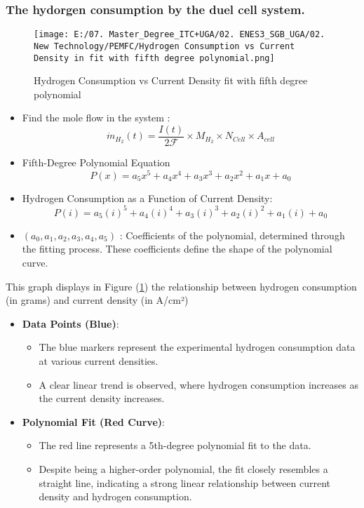 \documentclass[12pt,a4paper]{article}
\numberwithin{equation}{section}
\begin{document}
{\subsubsection{The hydorgen consumption by the duel cell system.}
\begin{figure}[h]
	\centering 
	\texttt{[image: E:/07. Master\_Degree\_ITC+UGA/02. ENES3\_SGB\_UGA/02. New Technology/PEMFC/Hydrogen Consumption vs Current Density in fit with fifth degree polynomial.png]}
	\caption{\small {Hydrogen Consumption vs Current Density fit with fifth degree polynomial}}
	\label{17}
\end{figure}
\begin{itemize}
	\item Find the mole flow in the system : 
	\begin{equation}
		\dot{m}_{H_2}(t) = \frac{I(t)}{2\mathscr{F}}\times M_{H_2} \times N_{Cell} \times A_{cell} \label{eq2.7}
	\end{equation}

	\item Fifth-Degree Polynomial Equation
	\begin{equation}
		P(x) = a_5 x^5 + a_4 x^4 + a_3 x^3 + a_2 x^2 + a_1 x + a_0
	\end{equation}
	\item Hydrogen Consumption as a Function of Current Density:
	\begin{equation}
		P(i) = a_5 (i)^5 + a_4 (i)^4 + a_3 (i)^3 + a_2 (i)^2 + a_1 (i) + a_0
	\end{equation}
	\item $(a_0, a_1, a_2, a_3, a_4, a_5)$ : Coefficients of the polynomial, determined through the fitting process. These coefficients define the shape of the polynomial curve.
\end{itemize}
This graph displays in Figure (\ref{17}) the relationship between hydrogen consumption (in grams) and current density (in A/cm²)
\begin{itemize}
	\item \textbf{Data Points (Blue)}:
	\begin{itemize}
		\item The blue markers represent the experimental hydrogen consumption data at various current densities.
		\item A clear linear trend is observed, where hydrogen consumption increases as the current density increases.
	\end{itemize}
	
	\item \textbf{Polynomial Fit (Red Curve)}:
	\begin{itemize}
		\item The red line represents a 5th-degree polynomial fit to the data.
		\item Despite being a higher-order polynomial, the fit closely resembles a straight line, indicating a strong linear relationship between current density and hydrogen consumption.
	\end{itemize}
	

\end{itemize}}
\end{document}

